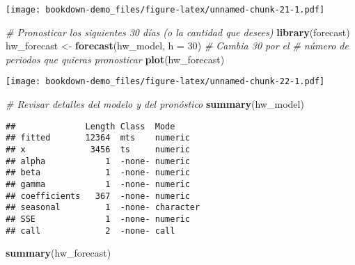 \documentclass[
]{book}
\newenvironment{Shaded}{\begin{snugshade}}{\end{snugshade}}
\newcommand{\AttributeTok}[1]{\textcolor[rgb]{0.13,0.29,0.53}{#1}}
\newcommand{\CommentTok}[1]{\textcolor[rgb]{0.56,0.35,0.01}{\textit{#1}}}
\newcommand{\DecValTok}[1]{\textcolor[rgb]{0.00,0.00,0.81}{#1}}
\newcommand{\FunctionTok}[1]{\textcolor[rgb]{0.13,0.29,0.53}{\textbf{#1}}}
\newcommand{\NormalTok}[1]{#1}
\newcommand{\OtherTok}[1]{\textcolor[rgb]{0.56,0.35,0.01}{#1}}
\begin{document}
\texttt{[image: bookdown-demo\_files/figure-latex/unnamed-chunk-21-1.pdf]}

\begin{Shaded}
\begin{Highlighting}[]
\CommentTok{\# Pronosticar los siguientes 30 días (o la cantidad que desees)}
\FunctionTok{library}\NormalTok{(forecast)}
\NormalTok{hw\_forecast }\OtherTok{\textless{}{-}} \FunctionTok{forecast}\NormalTok{(hw\_model, }\AttributeTok{h =} \DecValTok{30}\NormalTok{)  }\CommentTok{\# Cambia 30 por el }
\CommentTok{\# número de periodos que quieras pronosticar}
\FunctionTok{plot}\NormalTok{(hw\_forecast)}
\end{Highlighting}
\end{Shaded}

\texttt{[image: bookdown-demo\_files/figure-latex/unnamed-chunk-22-1.pdf]}

\begin{Shaded}
\begin{Highlighting}[]
\CommentTok{\# Revisar detalles del modelo y del pronóstico}
\FunctionTok{summary}\NormalTok{(hw\_model)}
\end{Highlighting}
\end{Shaded}

\begin{verbatim}
##              Length Class  Mode     
## fitted       12364  mts    numeric  
## x             3456  ts     numeric  
## alpha            1  -none- numeric  
## beta             1  -none- numeric  
## gamma            1  -none- numeric  
## coefficients   367  -none- numeric  
## seasonal         1  -none- character
## SSE              1  -none- numeric  
## call             2  -none- call
\end{verbatim}

\begin{Shaded}
\begin{Highlighting}[]
\FunctionTok{summary}\NormalTok{(hw\_forecast)}
\end{Highlighting}
\end{Shaded}
\end{document}
